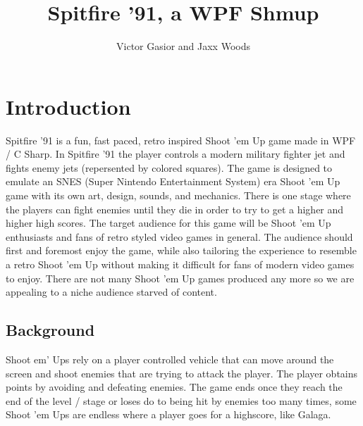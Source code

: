 \documentclass[10pt,conference,onecolumn,compsoc]{IEEEtran}
\begin{document}
\title{Spitfire '91, a WPF Shmup}
%
%


\author{Victor Gasior and Jaxx Woods
}



\maketitle



\IEEEdisplaynontitleabstractindextext

\IEEEpeerreviewmaketitle



\section{Introduction}
Spitfire '91 is a fun, fast paced, retro inspired Shoot 'em Up game made in WPF / C Sharp. In Spitfire '91 the player controls a modern military fighter jet and fights enemy jets (repersented by colored squares). The game is designed to emulate an SNES (Super Nintendo Entertainment System) era Shoot 'em Up game with its own art, design, sounds, and mechanics. There is one stage where the players can fight enemies until they die in order to try to get a higher and higher high scores. The target audience for this game will be Shoot 'em Up enthusiasts and fans of retro styled video games in general. The audience should first and foremost enjoy the game, while also tailoring the experience to resemble a retro Shoot 'em Up without making it difficult for fans of modern video games to enjoy.  There are not many Shoot 'em Up games produced any more so we are appealing to a niche audience starved of content.



\subsection{Background}
Shoot em' Ups rely on a player controlled vehicle that can move around the screen and shoot enemies that are trying to attack the player. The player obtains points by avoiding and defeating enemies. The game ends once they reach the end of the level / stage or loses do to being hit by enemies too many times, some Shoot 'em Ups are endless where a player goes for a highscore, like Galaga.
\end{document}
